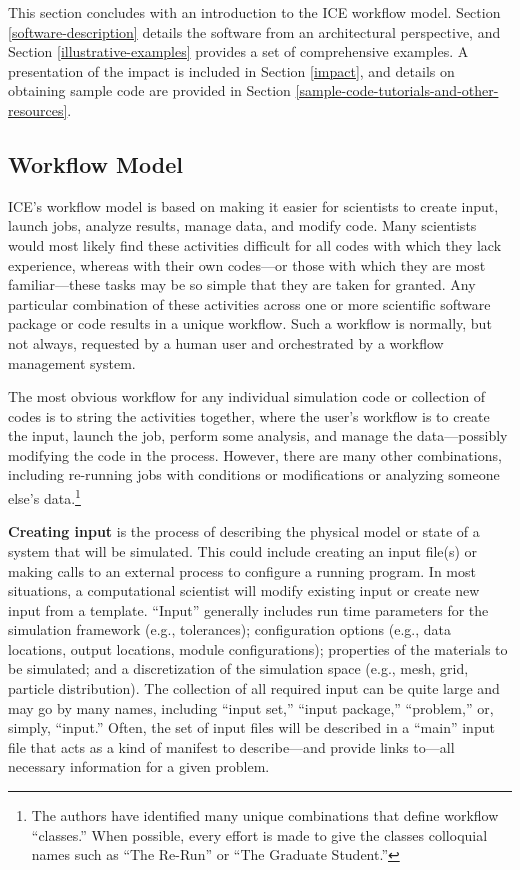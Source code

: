 This section concludes with an introduction to the ICE workflow model. Section \ref{software-description} details the software
from an architectural perspective, and Section \ref{illustrative-examples}
provides a set of comprehensive examples. A
presentation of the impact is included in Section \ref{impact}, and details on obtaining sample 
code are provided in Section \ref{sample-code-tutorials-and-other-resources}.

\subsection{Workflow Model}\label{workflow-model}

ICE's workflow model is based on making it easier for scientists to create input, launch jobs, analyze results, manage data, and modify code. Many scientists would
most likely find these activities difficult for all codes with which
they lack experience, whereas with their own codes---or those with which
they are most familiar---these tasks may be so simple that they are
taken for granted. Any particular combination of these activities across
one or more scientific software package or code results in a unique
workflow. Such a workflow is normally, but not always, requested
by a human user and orchestrated by a workflow management system.

The most obvious workflow for any individual simulation code or
collection of codes is to string the activities together, where the user's
workflow is to create the input, launch the job, perform some analysis,
and manage the data---possibly modifying the code in the process. However, 
there are many other combinations, including re-running jobs with
conditions or modifications or analyzing someone else's data.\footnote{The
authors have identified many unique combinations that
define workflow ``classes.'' When possible, every effort is made to give the
classes colloquial names such as ``The Re-Run'' or ``The Graduate Student.''}

\textbf{Creating input} is the process of describing the physical model
or state of a system that will be simulated. This could include creating
an input file(s) or making calls to an external process to configure a
running program. In most situations, a computational scientist will
modify existing input or create new input from a template. ``Input''
generally includes run time parameters for the simulation framework
(e.g., tolerances); configuration options (e.g., data locations, output
locations, module configurations); properties of the materials to be
simulated; and a discretization of the simulation space (e.g., mesh,
grid, particle distribution). The collection of all required input can
be quite large and may go by many names, including ``input set,''
``input package,'' ``problem,'' or, simply, ``input.'' Often, the set of
input files will be described in a ``main'' input file that acts as a
kind of manifest to describe---and provide links to---all necessary
information for a given problem.

